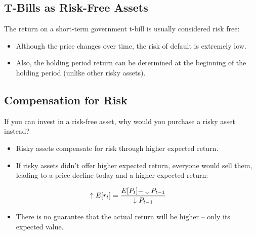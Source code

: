 \documentclass[letterpaper,10pt,english]{sphinxmanual}
\begin{document}
\subsection{T-Bills as Risk-Free Assets}
\label{risk:t-bills-as-risk-free-assets}
The return on a short-term government t-bill is usually considered
risk free:
\begin{itemize}
\item {} 
Although the price changes over time, the risk of default is
extremely low.

\end{itemize}
\begin{itemize}
\item {} 
Also, the holding period return can be determined at the beginning
of the holding period (unlike other risky assets).

\end{itemize}


\subsection{Compensation for Risk}
\label{risk:compensation-for-risk}
If you can invest in a risk-free asset, why would you purchase a
risky asset instead?
\begin{itemize}
\item {} 
Risky assets compensate for risk through higher expected
return.

\end{itemize}
\begin{itemize}
\item {} 
If risky assets didn't offer higher expected return, everyone would
sell them, leading to a price decline today and a higher expected
return:

\end{itemize}
\begin{gather}
\begin{split}\uparrow E[r_t] & = \frac{E[P_t] - \downarrow
P_{t-1}}{\downarrow P_{t-1}}\end{split}\notag
\end{gather}\begin{itemize}
\item {} 
There is no guarantee that the actual return will be higher -- only
its expected value.

\end{itemize}
\end{document}
